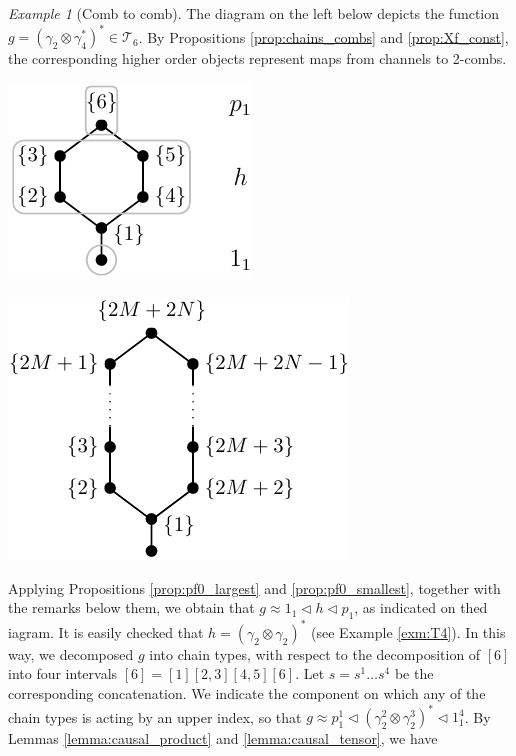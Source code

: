 \documentclass[12pt]{article}
\theoremstyle{definition}
\theoremstyle{remark}
\newtheorem{exm}{Example}
\def\Te{\mathcal T}
\def\vtl{\vartriangleleft}
\begin{document}
\begin{exm}[Comb to comb]\label{exm:comb_to_comb} The diagram on the left below depicts the function
$g=(\gamma_2\otimes \gamma_4^*)^*\in \Te_6$. By Propositions \ref{prop:chains_combs} and
\ref{prop:Xf_const}, the corresponding higher order objects represent maps from channels
to 2-combs. 
\begin{center}
\begin{minipage}[c]{0.45\textwidth}
\centering
\includegraphics[scale=0.8]{c_to_c12.pdf}
\end{minipage}
\begin{minipage}[c]{0.45\textwidth}
\centering
\includegraphics[scale=0.8]{c_to_cMN.pdf}
\end{minipage}
\end{center}
Applying Propositions \ref{prop:pf0_largest} and \ref{prop:pf0_smallest}, together with
the remarks below them, we obtain that $g\approx 1_1\vtl h\vtl p_1$, as indicated on thed
iagram. It is easily checked that
$h=(\gamma_2\otimes\gamma_2)^*$ (see Example \ref{exm:T4}). In this way, we decomposed $g$
into chain types, with respect to the decomposition of $[6]$ into four intervals $[6]=[1][2,3][4,5][6]$. Let
$s=s^1\dots s^4$ be the corresponding concatenation. We indicate the component on which
any of the chain types is acting by an upper index, so that 
 $g\approx p_1^1\vtl (\gamma_2^2\otimes \gamma_2^3)^*\vtl 1_1^4$. By Lemmas \ref{lemma:causal_product} and \ref{lemma:causal_tensor}, we have

\end{exm}
\end{document}

